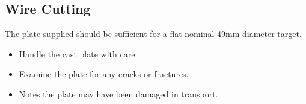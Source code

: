 \subsection{Wire Cutting}
The plate supplied should be sufficient for a flat nominal 49mm diameter target. 
\begin{itemize}
\item Handle the cast plate with care. 
\item Examine the plate for any cracks or fractures. 
\item Notes the plate may have been damaged in transport. 
\end{itemize}